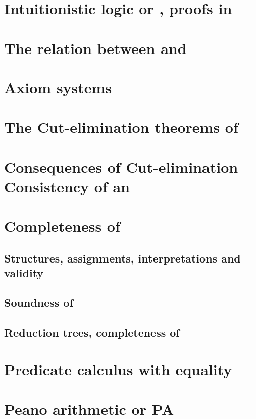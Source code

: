 \documentclass[11pt,a4paper]{article}
\begin{document}
\section{Intuitionistic logic or \IK, proofs in \IK}

\section{The relation between \LK{} and \IK}

\section{Axiom systems}

\section{The Cut-elimination theorems of \LK}

\section{Consequences of Cut-elimination -- Consistency of \LK{} an \IK}

\section{Completeness of \LK}

\subsection{Structures, assignments, interpretations and validity}

\subsection{Soundness of \LK}

\subsection{Reduction trees, completeness of \LK}

\section{Predicate calculus with equality}

\section{Peano arithmetic or PA}
\end{document}
